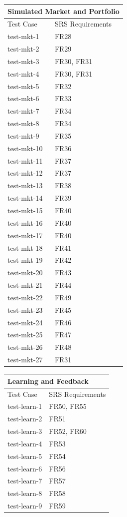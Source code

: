 \documentclass[12pt, titlepage]{article}
\begin{document}
\begin{center}
\begin{tabular}{p{} p{}}
\hline
\multicolumn{2}{l}{Simulated Market and Portfolio} \\
\hline
Test Case & SRS Requirements \\
\hline
test-mkt-1 & FR28 \\
test-mkt-2 & FR29 \\
test-mkt-3 & FR30, FR31 \\
test-mkt-4 & FR30, FR31 \\
test-mkt-5 & FR32 \\
test-mkt-6 & FR33 \\
test-mkt-7 & FR34 \\
test-mkt-8 & FR34 \\
test-mkt-9 & FR35 \\
test-mkt-10 & FR36 \\
test-mkt-11 & FR37 \\
test-mkt-12 & FR37 \\
test-mkt-13 & FR38 \\
test-mkt-14 & FR39 \\
test-mkt-15 & FR40 \\
test-mkt-16 & FR40 \\
test-mkt-17 & FR40 \\
test-mkt-18 & FR41 \\
test-mkt-19 & FR42 \\
test-mkt-20 & FR43 \\
test-mkt-21 & FR44 \\
test-mkt-22 & FR49 \\
test-mkt-23 & FR45 \\
test-mkt-24 & FR46 \\
test-mkt-25 & FR47 \\
test-mkt-26 & FR48 \\
test-mkt-27 & FR31 \\
\hline
\end{tabular}
\end{center}

\begin{center}
\begin{tabular}{p{} p{}}
\hline
\multicolumn{2}{l}{Learning and Feedback} \\
\hline
Test Case & SRS Requirements \\
\hline
test-learn-1 & FR50, FR55 \\
test-learn-2 & FR51 \\
test-learn-3 & FR52, FR60 \\
test-learn-4 & FR53 \\
test-learn-5 & FR54 \\
test-learn-6 & FR56 \\
test-learn-7 & FR57 \\
test-learn-8 & FR58 \\
test-learn-9 & FR59 \\
\hline
\end{tabular}
\end{center}
\end{document}
